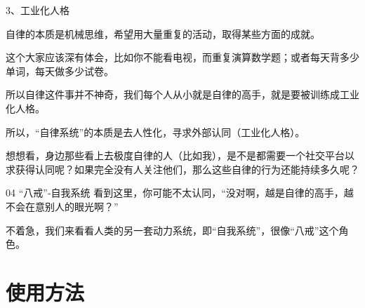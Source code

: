 \documentclass{cugrep}
\begin{document}
3、工业化人格

自律的本质是机械思维，希望用大量重复的活动，取得某些方面的成就。

这个大家应该深有体会，比如你不能看电视，而重复演算数学题；或者每天背多少单词，每天做多少试卷。

所以自律这件事并不神奇，我们每个人从小就是自律的高手，就是要被训练成工业化人格。



所以，“自律系统”的本质是去人性化，寻求外部认同（工业化人格）。

想想看，身边那些看上去极度自律的人（比如我），是不是都需要一个社交平台以求获得认同呢？如果完全没有人关注他们，那么这些自律的行为还能持续多久呢？


04 “八戒”-自我系统
看到这里，你可能不太认同，“没对啊，越是自律的高手，越不会在意别人的眼光啊？”

不着急，我们来看看人类的另一套动力系统，即“自我系统”，很像“八戒”这个角色。

\chapter{使用方法}
\end{document}

